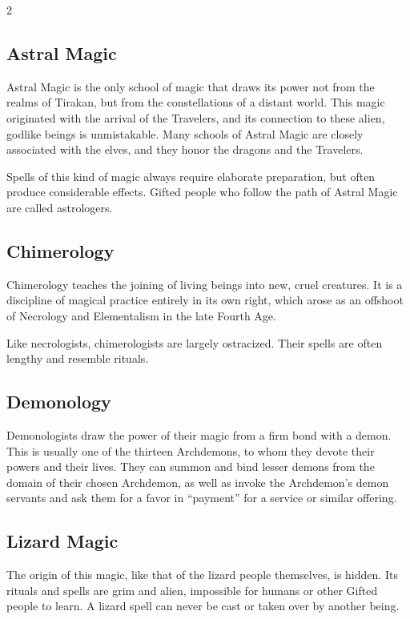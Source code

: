\begin{multicols}{2}
{\subsection{Astral Magic}\label{subsec:astrale-magie}

Astral Magic is the only school of magic that draws its power not from the realms of Tirakan, but from the constellations of a distant world. This magic originated with the arrival of the Travelers, and its connection to these alien, godlike beings is unmistakable. Many schools of Astral Magic are closely associated with the elves, and they honor the dragons and the Travelers.

Spells of this kind of magic always require elaborate preparation, but often produce considerable effects. Gifted people who follow the path of Astral Magic are called astrologers.

\subsection{Chimerology}\label{subsec:chimarologie}

Chimerology teaches the joining of living beings into new, cruel creatures. It is a discipline of magical practice entirely in its own right, which arose as an offshoot of Necrology and Elementalism in the late Fourth Age.

Like necrologists, chimerologists are largely ostracized. Their spells are often lengthy and resemble rituals.

\subsection{Demonology}\label{subsec:damonologie}

Demonologists draw the power of their magic from a firm bond with a demon. This is usually one of the thirteen Archdemons, to whom they devote their powers and their lives. They can summon and bind lesser demons from the domain of their chosen Archdemon, as well as invoke the Archdemon's demon servants and ask them for a favor in ``payment'' for a service or similar offering.

\subsection{Lizard Magic}\label{subsec:echsenmagie}

The origin of this magic, like that of the lizard people themselves, is hidden. Its rituals and spells are grim and alien, impossible for humans or other Gifted people to learn. A lizard spell can never be cast or taken over by another being.

}
\end{multicols}
